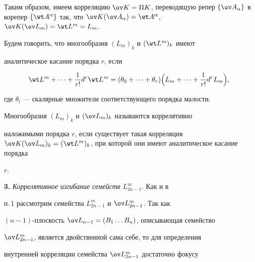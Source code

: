 Таким образом, имеем корреляцию $\ov K=\Pi K$, переводящую репер $\{\ov 


A_\alpha\}$ в корепер $\{\wt A^\alpha\}$ так, что $\ov K(\ov 


A_\alpha)=\wt A^\alpha$, $\ov K(\ov L_m)=\wt L^m=L_m$. 


 


\begin{defn} 


Будем говорить, что многообразия $(L_m)_k$ и $(\wt L^m)_k$ имеют 


аналитическое касание порядка $r$, если 


\begin{equation} 


\wt L^m+\dotsb+\frac{1}{r!}d^r\wt L^m= 


(\theta_0+\dotsb+\theta_r)\Big(L_m+\dotsb+\frac{1}{r!} 


d^r L_m\Big), 


\end{equation} 


где $\theta_l$ --- скалярные множители соответствующего порядка малости. 


\end{defn} 


 


\begin{defn} 


Многообразия $(L_m)_k$ и $(\ov L_m)_k$ называются коррелятивно 


наложимыми порядка $r$, если существует такая корреляция $\ov K(\ov 


L_m)_k=(\wt L^m)_k$, при которой они имеют аналитическое касание порядка 


$r$. 


\end{defn} 


 


{\bf 3.} {\it Коррелятивное изгибание семейств $L^m_{2n-1}$}. Как и в 


п.\,1 рассмотрим семейства $L^m_{2n-1}$ и $\ov L^m_{2n-1}$. Так как 


$(n-1)$-плоскость $\ov L_{n-1}=(B_1\dotsc B_n)$, описывающая семейство 


$\ov L^m_{2n-1}$, является двойственной сама себе, то для определения 


внутренней корреляции семейства $\ov L^m_{2n-1}$ достаточно фокусу 



